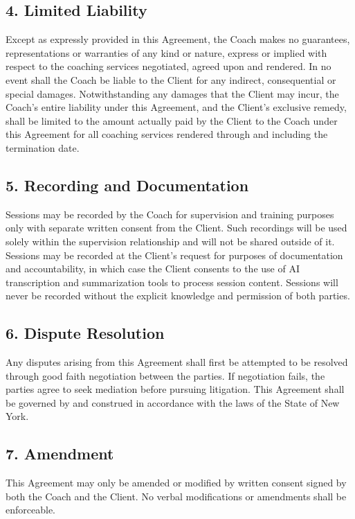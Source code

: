 \documentclass[11pt,letterpaper]{article}
\begin{document}
\subsection*{4. Limited Liability}

Except as expressly provided in this Agreement, the Coach makes no guarantees, representations or warranties of any kind or nature, express or implied with respect to the coaching services negotiated, agreed upon and rendered. In no event shall the Coach be liable to the Client for any indirect, consequential or special damages. Notwithstanding any damages that the Client may incur, the Coach's entire liability under this Agreement, and the Client's exclusive remedy, shall be limited to the amount actually paid by the Client to the Coach under this Agreement for all coaching services rendered through and including the termination date.

\subsection*{5. Recording and Documentation}

Sessions may be recorded by the Coach for supervision and training purposes only with separate written consent from the Client. Such recordings will be used solely within the supervision relationship and will not be shared outside of it. Sessions may be recorded at the Client's request for purposes of documentation and accountability, in which case the Client consents to the use of AI transcription and summarization tools to process session content. Sessions will never be recorded without the explicit knowledge and permission of both parties.

\subsection*{6. Dispute Resolution}

Any disputes arising from this Agreement shall first be attempted to be resolved through good faith negotiation between the parties. If negotiation fails, the parties agree to seek mediation before pursuing litigation. This Agreement shall be governed by and construed in accordance with the laws of the State of New York.

\subsection*{7. Amendment}

This Agreement may only be amended or modified by written consent signed by both the Coach and the Client. No verbal modifications or amendments shall be enforceable.
\end{document}

